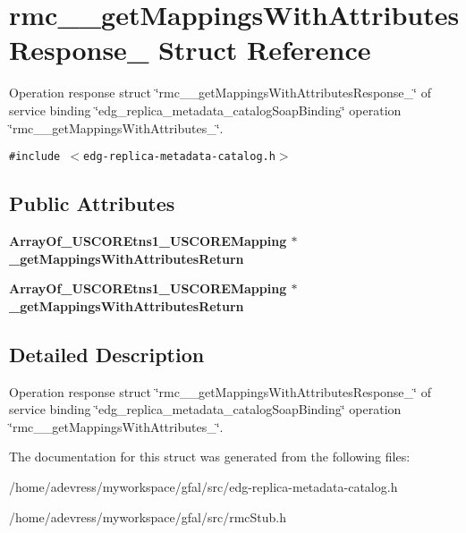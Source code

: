 \section{rmc\_\-\_\-get\-Mappings\-With\-Attributes\-Response\_\- Struct Reference}
\label{structrmc____getMappingsWithAttributesResponse__}
Operation response struct \char`\"{}rmc\_\-\_\-get\-Mappings\-With\-Attributes\-Response\_\-\char`\"{} of service binding \char`\"{}edg\_\-replica\_\-metadata\_\-catalog\-Soap\-Binding\char`\"{} operation \char`\"{}rmc\_\-\_\-get\-Mappings\-With\-Attributes\_\-\char`\"{}.  


{\tt \#include $<$edg-replica-metadata-catalog.h$>$}

\subsection*{Public Attributes}
\begin{CompactItemize}
\item 
\bf{Array\-Of\_\-USCOREtns1\_\-USCOREMapping} $\ast$ \textbf{\_\-get\-Mappings\-With\-Attributes\-Return}\label{structrmc____getMappingsWithAttributesResponse___89993016d52d39fb17a8b724251b98ff}

\item 
\bf{Array\-Of\_\-USCOREtns1\_\-USCOREMapping} $\ast$ \textbf{\_\-get\-Mappings\-With\-Attributes\-Return}\label{structrmc____getMappingsWithAttributesResponse___89993016d52d39fb17a8b724251b98ff}

\end{CompactItemize}


\subsection{Detailed Description}
Operation response struct \char`\"{}rmc\_\-\_\-get\-Mappings\-With\-Attributes\-Response\_\-\char`\"{} of service binding \char`\"{}edg\_\-replica\_\-metadata\_\-catalog\-Soap\-Binding\char`\"{} operation \char`\"{}rmc\_\-\_\-get\-Mappings\-With\-Attributes\_\-\char`\"{}. 



The documentation for this struct was generated from the following files:\begin{CompactItemize}
\item 
/home/adevress/myworkspace/gfal/src/edg-replica-metadata-catalog.h\item 
/home/adevress/myworkspace/gfal/src/rmc\-Stub.h\end{CompactItemize}
